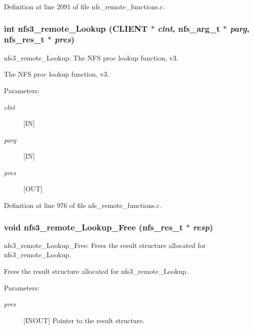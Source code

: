 Definition at line 2091 of file nfs\_\-remote\_\-functions.c.
\subsubsection[{nfs3\_\-remote\_\-Lookup}]{\setlength{\rightskip}{0pt plus 5cm}int nfs3\_\-remote\_\-Lookup (CLIENT $\ast$ {\em clnt}, \/  nfs\_\-arg\_\-t $\ast$ {\em parg}, \/  nfs\_\-res\_\-t $\ast$ {\em pres})}\label{group__NFSprocs_gf3f3347a08ce55f01227c401d0e49053}


nfs3\_\-remote\_\-Lookup: The NFS proc lookup function, v3.

The NFS proc lookup function, v3.

\begin{Desc}
\item[Parameters:]
\begin{description}
\item[{\em clnt}][IN] \item[{\em parg}][IN] \item[{\em pres}][OUT] \end{description}
\end{Desc}


Definition at line 976 of file nfs\_\-remote\_\-functions.c.
\subsubsection[{nfs3\_\-remote\_\-Lookup\_\-Free}]{\setlength{\rightskip}{0pt plus 5cm}void nfs3\_\-remote\_\-Lookup\_\-Free (nfs\_\-res\_\-t $\ast$ {\em resp})}\label{group__NFSprocs_g6dedbfc85992188e098b8a3da8afcde9}


nfs3\_\-remote\_\-Lookup\_\-Free: Frees the result structure allocated for nfs3\_\-remote\_\-Lookup.

Frees the result structure allocated for nfs3\_\-remote\_\-Lookup.

\begin{Desc}
\item[Parameters:]
\begin{description}
\item[{\em pres}][INOUT] Pointer to the result structure. \end{description}
\end{Desc}



